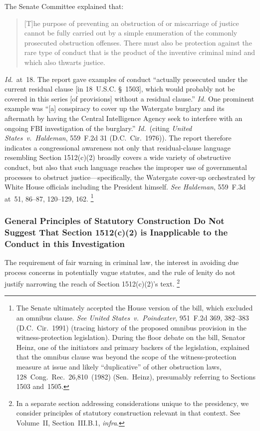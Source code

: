 The Senate Committee explained that:

\begin{quote}
[T]he purpose of preventing an obstruction of or miscarriage of justice cannot be fully carried out by a simple enumeration of the commonly prosecuted obstruction offenses.
There must also be protection against the rare type of conduct that is the product of the inventive criminal mind and which also thwarts justice.
\end{quote}

\textit{Id.}~at~18.
The report gave examples of conduct ``actually prosecuted under the current residual clause [in 18~U.S.C. \S~1503], which would probably not be covered in this series [of provisions] without a residual clause.''
\textit{Id.}
One prominent example was ``[a] conspiracy to cover up the Watergate burglary and its aftermath by having the Central Intelligence Agency seek to interfere with an ongoing FBI investigation of the burglary.''
\textit{Id.}~(citing \textit{United States~v.\ Haldeman}, 559~F.2d 31 (D.C.~Cir.~1976)).
The report therefore indicates a congressional awareness not only that residual-clause language resembling Section 1512(c)(2) broadly covers a wide variety of obstructive conduct, but also that such language reaches the improper use of governmental processes to obstruct justice---specifically, the Watergate cover-up orchestrated by White House officials including the President himself.
\textit{See Haldeman}, 559~F.3d at~51, 86--87, 120--129, 162.%
\footnote{The Senate ultimately accepted the House version of the bill, which excluded an omnibus clause.
\textit{See United States~v.\ Poindexter}, 951~F.2d 369, 382--383 (D.C.~Cir.~1991) (tracing history of the proposed omnibus provision in the witness-protection legislation).
During the floor debate on the bill, Senator Heinz, one of the initiators and primary backers of the legislation, explained that the omnibus clause was beyond the scope of the witness-protection measure at issue and likely ``duplicative'' of other obstruction laws, 128~Cong.\ Rec.\ 26,810~(1982) (Sen.~Heinz), presumably referring to Sections 1503 and~1505.}

\subsubsection{General Principles of Statutory Construction Do Not Suggest That Section 1512(c)(2) is Inapplicable to the Conduct in this Investigation}

The requirement of fair warning in criminal law, the interest in avoiding due process concerns in potentially vague statutes, and the rule of lenity do not justify narrowing the reach of Section 1512(c)(2)'s text.%
\footnote{In a separate section addressing considerations unique to the presidency, we consider principles of statutory construction relevant in that context.
See Volume~II, Section~III.B.1, \textit{infra}.}


